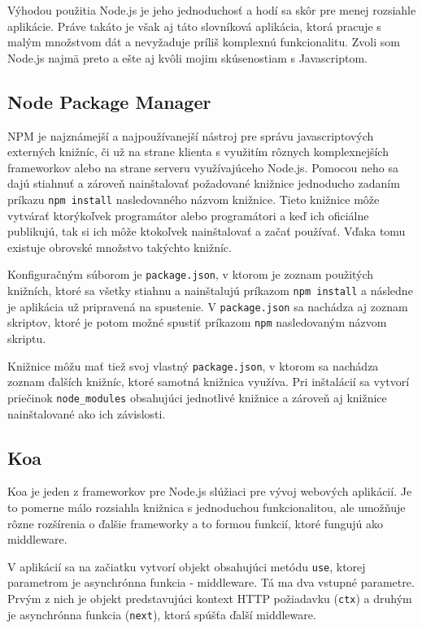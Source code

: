 \documentclass[
  digital, %
  table,   %
  lof,     %
  lot,     %
]{fithesis3}
\begin{document}
Výhodou použitia Node.js je jeho jednoduchosť a hodí sa skôr pre menej rozsiahle aplikácie. Práve takáto je však aj táto slovníková aplikácia, ktorá pracuje s malým množstvom dát a nevyžaduje príliš komplexnú funkcionalitu. Zvoli som Node.js najmä preto a ešte aj kvôli mojim skúsenostiam s Javascriptom.

\subsection{Node Package Manager}
NPM je najznámejší a najpoužívanejší nástroj pre správu javascriptových externých knižníc, či už na strane klienta s využitím rôznych komplexnejších frameworkov alebo na strane serveru využívajúceho Node.js. Pomocou neho sa dajú stiahnuť a zároveň nainštalovať požadované knižnice jednoducho zadaním príkazu \texttt{npm install} nasledovaného názvom knižnice. Tieto knižnice môže vytvárať ktorýkoľvek programátor alebo programátori a keď ich oficiálne publikujú, tak si ich môže ktokoľvek nainštalovať a začať používať. Vďaka tomu existuje obrovské množstvo takýchto knižníc.

Konfiguračným súborom je \texttt{package.json}, v ktorom je zoznam použitých knižních, ktoré sa všetky stiahnu a nainštalujú príkazom \texttt{npm install} a následne je aplikácia už pripravená na spustenie. V \texttt{package.json} sa nachádza aj zoznam skriptov, ktoré je potom možné spustiť príkazom \texttt{npm} nasledovaným názvom skriptu.

Knižnice môžu mať tiež svoj vlastný \texttt{package.json}, v ktorom sa nachádza zoznam ďalších knižníc, ktoré samotná knižnica využíva. Pri inštalácií sa vytvorí priečinok \texttt{node\_modules} obsahujúci jednotlivé knižnice a zároveň aj knižnice nainštalované ako ich závislosti.

\subsection{Koa}
Koa je jeden z frameworkov pre Node.js slúžiaci pre vývoj webových aplikácií. Je to pomerne málo rozsiahla knižnica s jednoduchou funkcionalitou, ale umožňuje rôzne rozšírenia o ďalšie frameworky a to formou funkcií, ktoré fungujú ako middleware. 

V aplikácií sa na začiatku vytvorí objekt obsahujúci metódu \texttt{use}, ktorej parametrom je asynchrónna funkcia - middleware. Tá ma dva vstupné parametre. Prvým z nich je objekt predstavujúci kontext HTTP požiadavku (\texttt{ctx}) a druhým je asynchrónna funkcia (\texttt{next}), ktorá spúšťa ďalší middleware.
\end{document}
